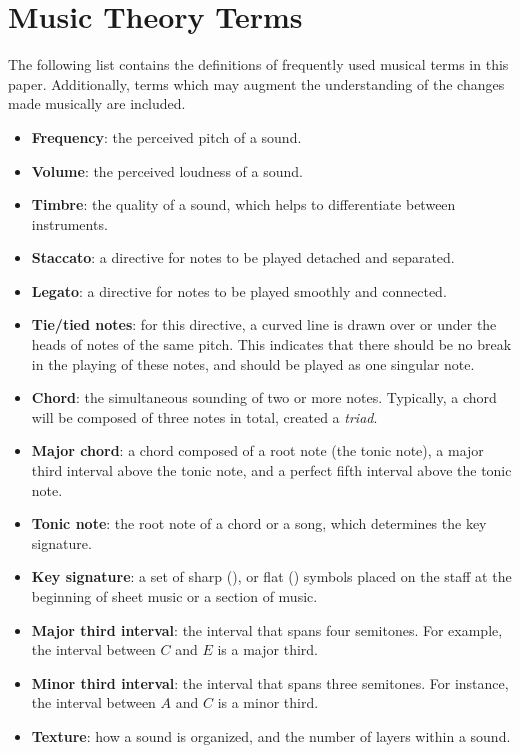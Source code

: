 \chapter{Music Theory Terms}\label{appendix:music-theory-terms}
The following list contains the definitions of frequently used musical terms in this paper. Additionally, terms which may augment the understanding of the changes made musically are included. 
\begin{itemize}
    \item {\textbf{Frequency}: the perceived pitch of a sound.}
    \item {\textbf{Volume}: the perceived loudness of a sound.}
    \item {\textbf{Timbre}: the quality of a sound, which helps to differentiate between instruments.}
    \item {\textbf{Staccato}: a directive for notes to be played detached and separated.}
    \item {\textbf{Legato}: a directive for notes to be played smoothly and connected.}
    \item {\textbf{Tie/tied notes}: for this directive, a curved line is drawn over or under the heads of notes of the same pitch. This indicates that there should be no break in the playing of these notes, and should be played as one singular note.}
    \item {\textbf{Chord}: the simultaneous sounding of two or more notes. Typically, a chord will be composed of three notes in total, created a \textit{triad}.}
    \item {\textbf{Major chord}: a chord composed of a root note (the tonic note), a major third interval above the tonic note, and a perfect fifth interval above the tonic note.}
    \item {\textbf{Tonic note}: the root note of a chord or a song, which determines the key signature.}
    \item {\textbf{Key signature}: a set of sharp (\musSharp{}), or flat (\musFlat{}) symbols placed on the staff at the beginning of sheet music or a section of music.}
    \item {\textbf{Major third interval}: the interval that spans four semitones. For example, the interval between $C$ and $E$ is a major third.}
    \item {\textbf{Minor third interval}: the interval that spans three semitones. For instance, the interval between $A$ and $C$ is a minor third.}
    \item {\textbf{Texture}: how a sound is organized, and the number of layers within a sound.}

\end{itemize}
